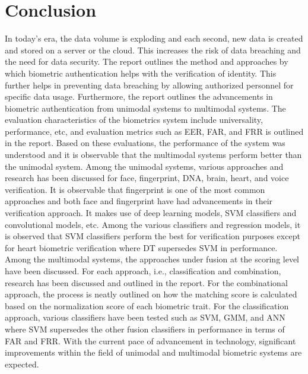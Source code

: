 \documentclass[a4paper, 12pt]{article}
\begin{document}
\section{\centering Conclusion}
\vskip 0.25in
In today's era, the data volume is exploding and each second, new data is created and stored on a server or the cloud. This increases the risk of data breaching and the need for data security. The report outlines the method and approaches by which biometric authentication helps with the verification of identity. This further helps in preventing data breaching by allowing authorized personnel for specific data usage. Furthermore, the report outlines the advancements in biometric authentication from unimodal systems to multimodal systems. The evaluation characteristics of the biometrics system include universality, performance, etc, and evaluation metrics such as EER, FAR, and FRR is outlined in the report. Based on these evaluations, the performance of the system was understood and it is observable that the multimodal systems perform better than the unimodal system. 
\vskip 0.2in
\noindent Among the unimodal systems, various approaches and research has been discussed for face, fingerprint, DNA, brain, heart, and voice verification. It is observable that fingerprint is one of the most common approaches and both face and fingerprint have had advancements in their verification approach. It makes use of deep learning models, SVM classifiers and convolutional models, etc. Among the various classifiers and regression models, it is observed that SVM classifiers perform the best for verification purposes except for heart biometric verification where DT supersedes SVM in performance.
\vskip 0.2in
\noindent Among the multimodal systems, the approaches under fusion at the scoring level have been discussed. For each approach, i.e., classification and combination, research has been discussed and outlined in the report. For the combinational approach, the process is neatly outlined on how the matching score is calculated based on the normalization score of each biometric trait. For the classification approach, various classifiers have been tested such as SVM, GMM, and ANN where SVM supersedes the other fusion classifiers in performance in terms of FAR and FRR.  With the current pace of advancement in technology, significant improvements within the field of unimodal and multimodal biometric systems are expected. 

\newpage
{}
{}
\printbibliography[heading={References}, title=References]
\newpage
{}
\end{document}
